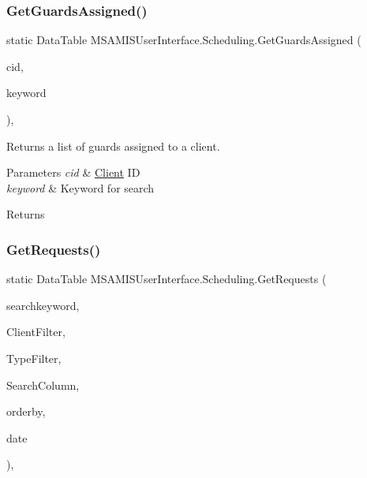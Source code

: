 \subsubsection{\texorpdfstring{Get\+Guards\+Assigned()}{GetGuardsAssigned()}}
{\footnotesize\ttfamily static Data\+Table M\+S\+A\+M\+I\+S\+User\+Interface.\+Scheduling.\+Get\+Guards\+Assigned (\begin{DoxyParamCaption}\item[{int}]{cid,  }\item[{String}]{keyword }\end{DoxyParamCaption})\hspace{0.3cm}{\ttfamily [inline]}, {\ttfamily [static]}}



Returns a list of guards assigned to a client. 


\begin{DoxyParams}{Parameters}
{\em cid} & \hyperlink{class_m_s_a_m_i_s_user_interface_1_1_client}{Client} ID\\
\hline
{\em keyword} & Keyword for search\\
\hline
\end{DoxyParams}
\begin{DoxyReturn}{Returns}

\end{DoxyReturn}
\mbox{\label{class_m_s_a_m_i_s_user_interface_1_1_scheduling_a510f2fb4c4bab2c0060b47f329c1a05c}} 
\subsubsection{\texorpdfstring{Get\+Requests()}{GetRequests()}}
{\footnotesize\ttfamily static Data\+Table M\+S\+A\+M\+I\+S\+User\+Interface.\+Scheduling.\+Get\+Requests (\begin{DoxyParamCaption}\item[{String}]{searchkeyword,  }\item[{int}]{Client\+Filter,  }\item[{int}]{Type\+Filter,  }\item[{String}]{Search\+Column,  }\item[{String}]{orderby,  }\item[{Date\+Time}]{date }\end{DoxyParamCaption})\hspace{0.3cm}{\ttfamily [inline]}, {\ttfamily [static]}}



